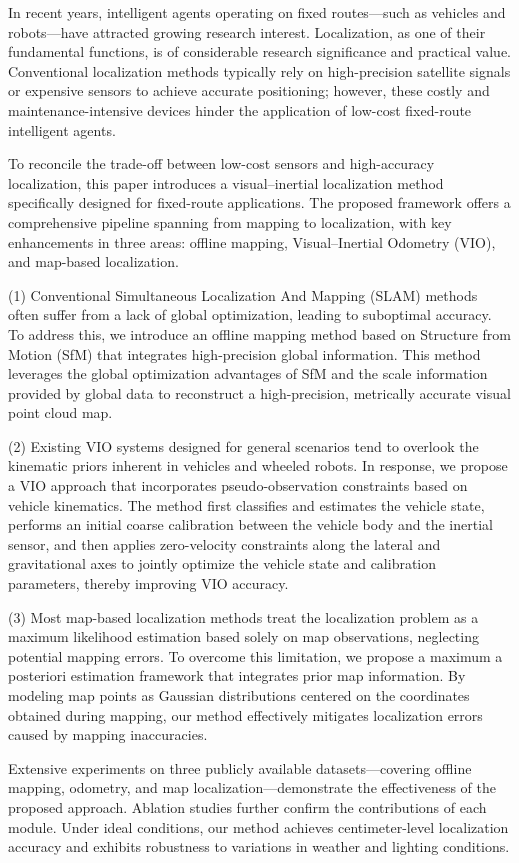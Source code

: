 \begin{abstract*}
  In recent years, intelligent agents operating on fixed routes—such as vehicles and robots—have attracted growing research interest. Localization, as one of their fundamental functions, is of considerable research significance and practical value. Conventional localization methods typically rely on high-precision satellite signals or expensive sensors to achieve accurate positioning; however, these costly and maintenance-intensive devices hinder the application of low-cost fixed-route intelligent agents.

  To reconcile the trade-off between low-cost sensors and high-accuracy localization, this paper introduces a visual–inertial localization method specifically designed for fixed-route applications. The proposed framework offers a comprehensive pipeline spanning from mapping to localization, with key enhancements in three areas: offline mapping, Visual–Inertial Odometry (VIO), and map-based localization.

  (1) Conventional Simultaneous Localization And Mapping (SLAM) methods often suffer from a lack of global optimization, leading to suboptimal accuracy. To address this, we introduce an offline mapping method based on Structure from Motion (SfM) that integrates high-precision global information. This method leverages the global optimization advantages of SfM and the scale information provided by global data to reconstruct a high-precision, metrically accurate visual point cloud map.

  (2) Existing VIO systems designed for general scenarios tend to overlook the kinematic priors inherent in vehicles and wheeled robots. In response, we propose a VIO approach that incorporates pseudo-observation constraints based on vehicle kinematics. The method first classifies and estimates the vehicle state, performs an initial coarse calibration between the vehicle body and the inertial sensor, and then applies zero-velocity constraints along the lateral and gravitational axes to jointly optimize the vehicle state and calibration parameters, thereby improving VIO accuracy.

  (3) Most map-based localization methods treat the localization problem as a maximum likelihood estimation based solely on map observations, neglecting potential mapping errors. To overcome this limitation, we propose a maximum a posteriori estimation framework that integrates prior map information. By modeling map points as Gaussian distributions centered on the coordinates obtained during mapping, our method effectively mitigates localization errors caused by mapping inaccuracies.

  Extensive experiments on three publicly available datasets—covering offline mapping, odometry, and map localization—demonstrate the effectiveness of the proposed approach. Ablation studies further confirm the contributions of each module. Under ideal conditions, our method achieves centimeter-level localization accuracy and exhibits robustness to variations in weather and lighting conditions.

\end{abstract*}
